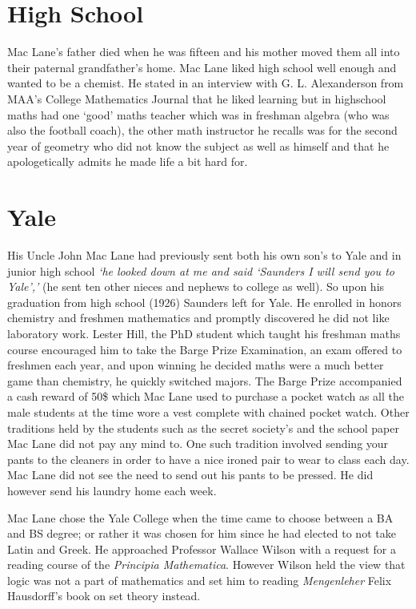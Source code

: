 \section{High School}

Mac Lane's father died when he was fifteen and his mother moved them all into their paternal grandfather's home. Mac Lane liked high school well enough and wanted to be a chemist. He stated in an interview with G. L. Alexanderson from MAA's College Mathematics Journal that he liked learning but in highschool maths had one `good' maths teacher which was in freshman algebra (who was also the football coach), the other math instructor he recalls was for the second year of geometry who did not know the subject as well as himself and that he apologetically admits he made life a bit hard for\cite{Ale1989}.

\section{Yale}

His Uncle John Mac Lane had previously sent both his own son's to Yale and in junior high school \emph{`he looked down at me and said `Saunders I will send you to Yale','} (he sent ten other nieces and nephews to college as well). So upon his graduation from high school (1926) Saunders left for Yale. He enrolled in honors chemistry and freshmen mathematics and promptly discovered he did not like laboratory work. Lester Hill, the PhD student which taught his freshman maths course encouraged him to take the Barge Prize Examination, an exam offered to freshmen each year, and upon winning he decided maths were a much better game than chemistry, he quickly switched majors. The Barge Prize accompanied a cash reward of 50\$ which Mac Lane used to purchase a pocket watch as all the male students at the time wore a vest complete with chained pocket watch. Other traditions held by the students such as the secret society's and the school paper Mac Lane did not pay any mind to. One such tradition involved sending your pants to the cleaners in order to have a nice ironed pair to wear to class each day. Mac Lane did not see the need to send out his pants to be pressed. He did however send his laundry home each week. 

Mac Lane chose the Yale College when the time came to choose between a BA and BS degree; or rather it was chosen for him since he had elected to not take Latin and Greek. He approached Professor Wallace Wilson with a request for a reading course of the \emph{Principia Mathematica}. However Wilson held the view that logic was not a part of mathematics and set him to reading \emph{Mengenleher} Felix Hausdorff's book on set theory instead.   

